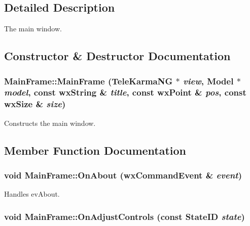\subsection{Detailed Description}
The main window. 

\subsection{Constructor \& Destructor Documentation}
\hypertarget{classMainFrame_09f15beb9d0af78bd614358ad05b09f7}{
\subsubsection[{MainFrame}]{\setlength{\rightskip}{0pt plus 5cm}MainFrame::MainFrame ({\bf TeleKarmaNG} $\ast$ {\em view}, \/  {\bf Model} $\ast$ {\em model}, \/  const wxString \& {\em title}, \/  const wxPoint \& {\em pos}, \/  const wxSize \& {\em size})}}
\label{classMainFrame_09f15beb9d0af78bd614358ad05b09f7}


Constructs the main window. 



\subsection{Member Function Documentation}
\hypertarget{classMainFrame_a6cb4bffa152fb2adad782a440af5de2}{
\subsubsection[{OnAbout}]{\setlength{\rightskip}{0pt plus 5cm}void MainFrame::OnAbout (wxCommandEvent \& {\em event})}}
\label{classMainFrame_a6cb4bffa152fb2adad782a440af5de2}


Handles evAbout. 

\hypertarget{classMainFrame_cf26ae04d239c8275ea85c5c4fc410e7}{
\subsubsection[{OnAdjustControls}]{\setlength{\rightskip}{0pt plus 5cm}void MainFrame::OnAdjustControls (const {\bf StateID} {\em state})}}
\label{classMainFrame_cf26ae04d239c8275ea85c5c4fc410e7}


